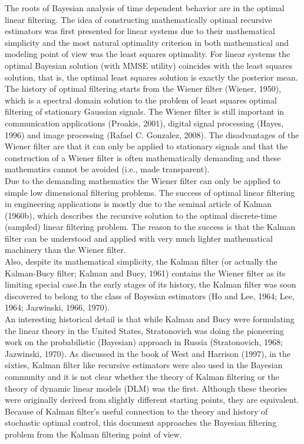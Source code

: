 \documentclass[10pt]{llncs}
\begin{document}
The roots of Bayesian analysis of time dependent behavior are in the optimal linear
filtering. The idea of constructing mathematically optimal recursive estimators was
first presented for linear systems due to their mathematical simplicity and the most natural optimality criterion in both mathematical and modeling point of view was the least squares optimality. For linear systems the optimal Bayesian solution (with MMSE utility) coincides with the least squares solution, that is, the optimal least squares solution is exactly the posterior mean.\\
The history of optimal filtering starts from the Wiener filter (Wiener, 1950), which is a spectral domain solution to the problem of least squares optimal filtering of stationary Gaussian signals. The Wiener filter is still important in communication applications (Proakis, 2001), digital signal processing (Hayes, 1996) and image processing (Rafael C. Gonzalez, 2008). The disadvantages of the Wiener filter are that it can only be applied to stationary signals and that the construction of a Wiener filter is often mathematically demanding and these mathematics cannot be avoided (i.e., made transparent).\\
Due to the demanding mathematics the Wiener filter can only be applied to simple low dimensional filtering problems. The success of optimal linear filtering in engineering applications is mostly due to the seminal article of Kalman (1960b), which describes the recursive solution to the optimal discrete-time (sampled) linear filtering problem. The reason to the success is that the Kalman filter can be understood and applied with very much lighter mathematical machinery than the Wiener filter. \\
Also, despite its mathematical simplicity, the Kalman filter (or actually the Kalman-Bucy filter; Kalman and Bucy, 1961) contains the Wiener filter as its limiting special case.In the early stages of its history, the Kalman filter was soon discovered to belong to the class of Bayesian estimators (Ho and Lee, 1964; Lee, 1964; Jazwinski, 1966, 1970). \\
An interesting historical detail is that while Kalman and Bucy were formulating the linear theory in the United States, Stratonovich was doing the pioneering work on the probabilistic (Bayesian) approach in Russia (Stratonovich, 1968; Jazwinski, 1970).
As discussed in the book of West and Harrison (1997), in the sixties, Kalman filter like recursive estimators were also used in the Bayesian community and it is not clear whether the theory of Kalman filtering or the theory of dynamic linear models (DLM) was the first. Although these theories were originally derived from slightly different starting points, they are equivalent. Because of Kalman filter’s useful connection to the theory and history of stochastic optimal control, this document approaches the Bayesian filtering problem from the Kalman filtering point of view.\\
\end{document}
